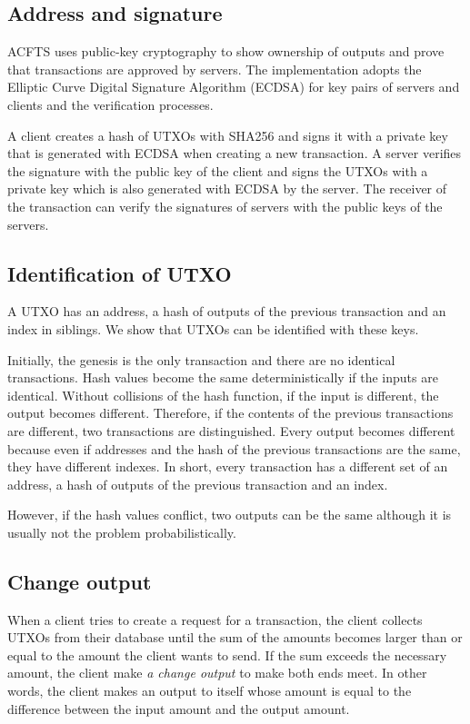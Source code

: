 \documentclass[a4paper, oneside]{discothesis}
\begin{document}
\subsection{Address and signature}
ACFTS uses public-key cryptography to show ownership of outputs
and prove that transactions are approved by servers.
The implementation adopts the Elliptic Curve Digital Signature Algorithm (ECDSA)
for key pairs of servers and clients and the verification processes.

A client creates a hash of UTXOs with SHA256 and signs it with a private key
that is generated with ECDSA when creating a new transaction.
A server verifies the signature with the public key of the client
and signs the UTXOs with a private key which is also generated with ECDSA by the server.
The receiver of the transaction can verify the signatures of servers
with the public keys of the servers.

\subsection{Identification of UTXO}
A UTXO has an address, a hash of outputs of the previous transaction and an index in siblings.
We show that UTXOs can be identified with these keys.

Initially, the genesis is the only transaction and there are no identical transactions.
Hash values become the same deterministically if the inputs are identical.
Without collisions of the hash function, if the input is different, the output becomes different.
Therefore, if the contents of the previous transactions are different,
two transactions are distinguished.
Every output becomes different because even if addresses and the hash
of the previous transactions are the same, they have different indexes.
In short, every transaction has a different set of an address,
a hash of outputs of the previous transaction and an index.

However, if the hash values conflict, two outputs can be the same
although it is usually not the problem probabilistically.


\subsection{Change output}
When a client tries to create a request for a transaction,
the client collects UTXOs from their database until the sum of the amounts
becomes larger than or equal to the amount the client wants to send.
If the sum exceeds the necessary amount, the client make \emph{a change output}
to make both ends meet.
In other words, the client makes an output to itself whose amount is equal to
the difference between the input amount and the output amount.
\end{document}
